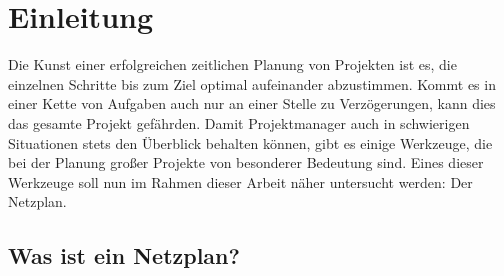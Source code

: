 \chapter{Einleitung}
\label{Einleitung}

Die Kunst einer erfolgreichen zeitlichen Planung von Projekten ist es, die
einzelnen Schritte bis zum Ziel optimal aufeinander abzustimmen. Kommt
es in einer Kette von Aufgaben auch nur an einer Stelle zu
Verz\"ogerungen, kann dies das gesamte Projekt gef\"ahrden. Damit
Projektmanager auch in schwierigen Situationen stets den \"Uberblick
behalten k\"onnen, gibt es einige Werkzeuge, die bei der Planung gro{\ss}er
Projekte von besonderer Bedeutung sind. Eines dieser Werkzeuge soll
nun im Rahmen dieser Arbeit n\"aher untersucht werden: Der Netzplan.

\section{Was ist ein Netzplan?}
\label{sec:netzplan}

